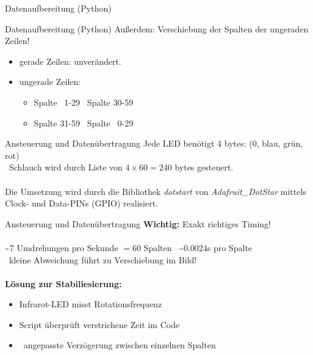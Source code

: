 \begin{frame}{Datenaufbereitung (Python)}

\end{frame}

\begin{frame}{Datenaufbereitung (Python)}
Außerdem: Verschiebung der Spalten der ungeraden Zeilen!\\
\begin{itemize}
\item gerade Zeilen: unverändert.
\item ungerade Zeilen:
\begin{itemize}
\item Spalte \ 1-29 \rightarrow\ Spalte 30-59
\item Spalte 31-59 \rightarrow\ Spalte \ 0-29
\end{itemize}
\end{itemize}


\end{frame}

\begin{frame}{Ansteuerung und Datenübertragung}
Jede LED benötigt 4 bytes: (0, blau, grün, rot)\\
\Rightarrow\ Schlauch wird durch Liste von $4\times60=240$ bytes gesteuert.\\
\ \\
Die Umsetzung wird durch die Bibliothek \emph{dotstart} von \emph{Adafruit\_DotStar} mittels Clock- und Data-PINs (GPIO) realisiert.\\
\end{frame}

\begin{frame}{Ansteuerung und Datenübertragung}{}
{\bf Wichtig:} Exakt richtiges Timing!\\
\ \\
\sim7 Umdrehungen pro Sekunde $=60$ Spalten \Rightarrow\ \sim0.0024s pro Spalte\\
\rightarrow\ kleine Abweichung führt zu Verschiebung im Bild!\\
\ \\
{\bf Lösung zur Stabiliesierung:}\\
\begin{itemize}
\item Infrarot-LED misst Rotationsfrequenz
\item Script überprüft verstrichene Zeit im Code
\item \Rightarrow\ angepasste Verzögerung zwischen einzelnen Spalten
\end{itemize}
\end{frame}

